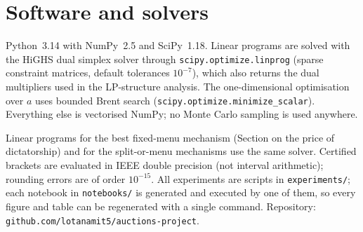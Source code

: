 \section{Software and solvers}
\label{app:tools}

Python~3.14 with NumPy~2.5 and SciPy~1.18. Linear programs are solved with the HiGHS dual
simplex solver through \texttt{scipy.optimize.linprog} (sparse constraint matrices, default
tolerances $10^{-7}$), which also returns the dual multipliers used in the LP-structure analysis. The
one-dimensional optimisation over $a$ uses bounded Brent search
(\texttt{scipy.optimize.minimize\_scalar}). Everything else is vectorised NumPy; no Monte Carlo
sampling is used anywhere.

Linear programs for the best fixed-menu mechanism (Section on the price of dictatorship) and for the
split-or-menu mechanisms use the same solver. Certified brackets are evaluated in IEEE double
precision (not interval arithmetic); rounding errors are of order $10^{-15}$. All experiments are
scripts in \texttt{experiments/}; each notebook in \texttt{notebooks/} is generated and executed by
one of them, so every figure and table can be regenerated with a single command. Repository:
\texttt{github.com/lotanamit5/auctions-project}.
